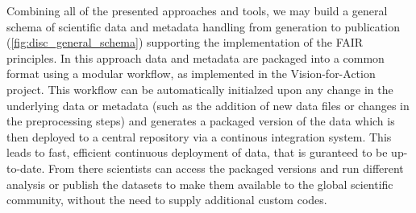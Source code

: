 Combining all of the presented approaches and tools, we may build a general schema of scientific data and metadata handling from generation to publication (\cref{fig:disc_general_schema}) supporting the implementation of the FAIR principles. In this approach data and metadata are packaged into a common format using a modular workflow, as implemented in the Vision-for-Action project. This workflow can be automatically initialzed upon any change in the underlying data or metadata (such as the addition of new data files or changes in the preprocessing steps) and generates a packaged version of the data which is then deployed to a central repository via a continous integration system. This leads to fast, efficient continuous deployment of data, that is guranteed to be up-to-date. From there scientists can access the packaged versions and run different analysis or publish the datasets to make them available to the global scientific community, without the need to supply additional custom codes.

